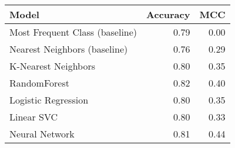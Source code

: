 \begin{tabular}{lrr}
\toprule
\textbf{Model}      & \textbf{Accuracy} & \textbf{MCC}  \\
\midrule
Most Frequent Class (baseline) & 0.79 & 0.00 \\
Nearest Neighbors (baseline)   & 0.76              & 0.29          \\     
K-Nearest Neighbors & 0.80              & 0.35          \\
RandomForest        & 0.82              & 0.40          \\
Logistic Regression & 0.80              & 0.35          \\
Linear SVC          & 0.80              & 0.33          \\
Neural Network      & 0.81              & 0.44          \\
\bottomrule
\end{tabular}
